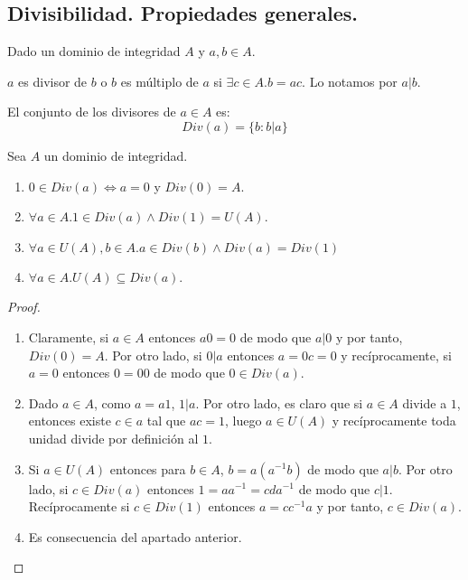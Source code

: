 \subsection{Divisibilidad. Propiedades generales.}

\begin{definition}
Dado un dominio de integridad $A$ y $a,b \in A$.

$a$ es divisor de $b$ o $b$ es múltiplo de $a$ si $\exists c \in A. b = ac$. Lo notamos por $a|b$.

El conjunto de los divisores de $a \in A$ es: $$Div(a) = \{b:b|a\}$$ 
\end{definition}

\begin{proposition}
Sea $A$ un dominio de integridad. 

\begin{enumerate}
\item $0 \in Div(a) \iff a = 0$ y $Div(0) = A$.
\item $\forall a \in A . 1 \in Div(a) \land Div(1) = U(A)$. 
\item $\forall a \in U(A),b \in A.a \in Div(b) \land Div(a) = Div(1)$ 
\item $\forall a \in A. U(A) \subseteq Div(a)$.
\end{enumerate}
\end{proposition}
\begin{proof}
\begin{enumerate}
\item Claramente, si $a \in A$ entonces $a0 = 0$ de modo que $a|0$ y por tanto, $Div(0) = A$. Por otro lado, si $0|a$ entonces $a = 0c = 0$ y recíprocamente, si $a = 0$ entonces $0 = 00$ de modo que $0 \in Div(a)$. 

\item Dado $a \in A$, como $a = a1$, $1 | a$. Por otro lado, es claro que si $a \in A$ divide a $1$, entonces existe $c \in a$ tal que $ac = 1$, luego $a \in U(A)$ y recíprocamente toda unidad divide por definición al $1$. 

\item Si $a \in U(A)$ entonces para $b \in A$, $b = a(a^{-1}b)$ de modo que $a|b$. Por otro lado, si $c \in Div(a)$ entonces $1 = aa^{-1} = cda^{-1}$ de modo que $c|1$. Recíprocamente si $c \in Div(1)$ entonces $a = cc^{-1}a$ y por tanto, $c \in Div(a)$. 

\item Es consecuencia del apartado anterior. 
\end{enumerate}
\end{proof}

